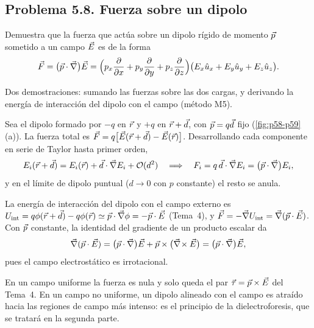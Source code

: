 

\subsection{Problema 5.8. Fuerza sobre un dipolo}\label{sec:p58}


\begin{problema}\label{prob:dipolo-fuerza}
Demuestra que la fuerza que actúa sobre un dipolo rígido de momento $\vec p$ sometido a un campo $\vec E$ es de la forma
\[
  \vec F=\big(\vec p\cdot\vec\nabla\big)\vec E=\Big(p_x\frac{\partial}{\partial x}+p_y\frac{\partial}{\partial y}+p_z\frac{\partial}{\partial z}\Big)\big(E_x\hat u_{x}+E_y\hat u_{y}+E_z\hat u_{z}\big).
\]
\end{problema}

\begin{resolucion}
\idea Dos demostraciones: sumando las fuerzas sobre las dos cargas, y derivando la energía de interacción del dipolo con el campo (método M5).

 Sea el dipolo formado por $-q$ en $\vec r$ y $+q$ en $\vec r+\vec d$, con $\vec p=q\vec d$ fijo (\cref{fig:p58-p59}\,(a)). La fuerza total
es $\vec F=q\big[\vec E(\vec r+\vec d)-\vec E(\vec r)\big]$. Desarrollando cada componente en serie de Taylor hasta primer orden,
\[
  E_i(\vec r+\vec d)=E_i(\vec r)+\vec d\cdot\vec\nabla E_i+\mathcal O(d^2)\quad\Longrightarrow\quad F_i=q\,\vec d\cdot\vec\nabla E_i=\big(\vec p\cdot\vec\nabla\big)E_i ,
\]
y en el límite de dipolo puntual ($d\to0$ con $p$ constante) el resto se anula.

 La energía de interacción del dipolo con el campo externo es $U_{\mathrm{int}}=q\phi(\vec r+\vec d)-q\phi(\vec r)\simeq\vec p\cdot\vec\nabla\phi=-\vec p\cdot\vec E$ (Tema~4), y
$\vec F=-\vec\nabla U_{\mathrm{int}}=\vec\nabla(\vec p\cdot\vec E)$. Con $\vec p$ constante, la identidad del gradiente de un producto escalar da
\[
  \vec\nabla(\vec p\cdot\vec E)=\big(\vec p\cdot\vec\nabla\big)\vec E+\vec p\times\big(\vec\nabla\!\times\vec E\big)=\big(\vec p\cdot\vec\nabla\big)\vec E ,
\]
pues el campo electrostático es irrotacional. \qedhere
\end{resolucion}

\begin{observacion}\label{obs:p58}
En un campo uniforme la fuerza es nula y solo queda el par $\vec\tau=\vec p\times\vec E$ del Tema~4. En un campo no uniforme, un dipolo alineado con el campo es atraído hacia
las regiones de campo más intenso: es el principio de la dielectroforesis, que se tratará en la segunda parte.
\end{observacion}


